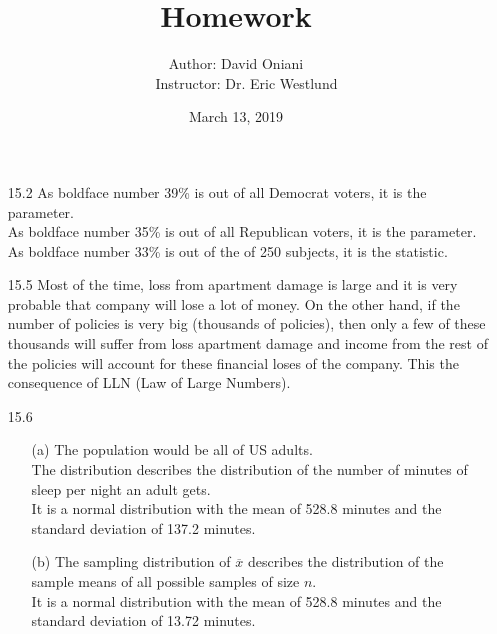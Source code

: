 \documentclass[11pt, a4paper]{article}
\title{\bf{Homework \textnumero 10}}
\author{Author: David Oniani
\\
\ \ \ Instructor: Dr. Eric Westlund}
\date{March 13, 2019}
\newcommand\und[1]{\underline{\smash{#1}}}
\begin{document}
\maketitle
\begin{itemize}
\item[15.2]
As boldface number 39\% is out of all Democrat voters, it is the parameter.\\
As boldface number 35\% is out of all Republican voters, it is the parameter.\\
As boldface number 33\% is out of the \und{sample} of 250 subjects, it is the statistic.

\item[]
\item[]

\item[15.5]
Most of the time, loss from apartment damage is large and it is very probable
that company will lose a lot of money. On the other hand, if the number of policies
is very big (thousands of policies), then only a few of these thousands will suffer from
loss apartment damage and income from the rest of the policies will account for these financial
loses of the company. This the consequence of LLN (Law of Large Numbers).

\item[]
\item[]

\item[15.6]
\begin{itemize}
\item[(a)]
The population would be all of US adults.\\
The distribution describes the distribution of the number
of minutes of sleep per night an adult gets.\\
It is a normal distribution with the mean of 528.8
minutes and the standard deviation of 137.2 minutes.

\item[]

\item[(b)]
The sampling distribution of $\overline{x}$ describes
the distribution of the sample means of all possible
samples of size $n$.\\
It is a normal distribution with the mean of 528.8 minutes
and the standard deviation of 13.72 minutes.
\end{itemize}

\newpage


\end{itemize}
\end{document}
